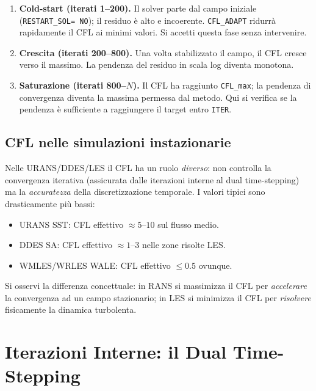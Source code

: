 \documentclass[11pt,a4paper]{article}
\newcommand{\ttcfg}[1]{\texttt{\color{codegray}#1}}
\begin{document}
\begin{infobox}
\begin{enumerate}
  \item \textbf{Cold-start (iterati 1--200).} Il solver parte dal
    campo iniziale (\ttcfg{RESTART\_SOL= NO}); il residuo è alto e
    incoerente. \texttt{CFL\_ADAPT} ridurrà rapidamente il CFL ai
    minimi valori. Si accetti questa fase senza intervenire.
  \item \textbf{Crescita (iterati 200--800).} Una volta stabilizzato
    il campo, il CFL cresce verso il massimo. La pendenza del residuo
    in scala log diventa monotona.
  \item \textbf{Saturazione (iterati 800--$N$).} Il CFL ha raggiunto
    \texttt{CFL\_max}; la pendenza di convergenza diventa la massima
    permessa dal metodo. Qui si verifica se la pendenza è
    sufficiente a raggiungere il target entro \ttcfg{ITER}.
\end{enumerate}
\end{infobox}

\subsection{CFL nelle simulazioni instazionarie}

Nelle URANS/DDES/LES il CFL ha un ruolo \emph{diverso}: non controlla
la convergenza iterativa (assicurata dalle iterazioni interne al dual
time-stepping) ma la \emph{accuratezza} della discretizzazione
temporale. I valori tipici sono drasticamente più bassi:
\begin{itemize}
  \item URANS SST: CFL effettivo $\approx 5$--$10$ sul flusso medio.
  \item DDES SA: CFL effettivo $\approx 1$--$3$ nelle zone risolte LES.
  \item WMLES/WRLES WALE: CFL effettivo $\le 0.5$ ovunque.
\end{itemize}

Si osservi la differenza concettuale: in RANS si massimizza il CFL per
\emph{accelerare} la convergenza ad un campo stazionario; in LES si
minimizza il CFL per \emph{risolvere} fisicamente la dinamica
turbolenta.

\section{Iterazioni Interne: il Dual Time-Stepping}
\label{sec:dualtime}
\end{document}
